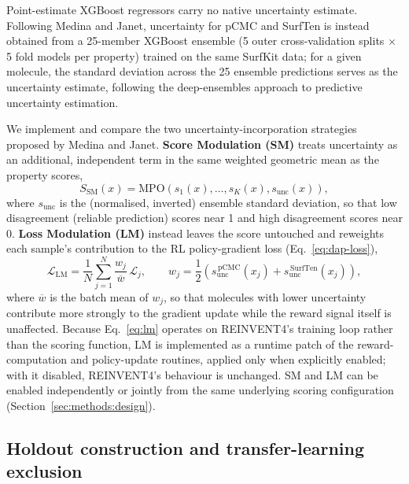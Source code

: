 \documentclass[11pt]{aime}
\begin{document}
Point-estimate XGBoost regressors carry no native uncertainty estimate.
Following Medina and Janet\cite{medina_uncertainty_2026}, uncertainty for pCMC and SurfTen is instead obtained from a 25-member XGBoost ensemble (5 outer cross-validation splits $\times$ 5 fold models per property) trained on the same SurfKit data;
for a given molecule, the standard deviation across the 25 ensemble predictions serves as the uncertainty estimate, following the deep-ensembles approach to predictive uncertainty estimation\cite{lakshminarayanan_simple_2017}.

We implement and compare the two uncertainty-incorporation strategies proposed by Medina and Janet\cite{medina_uncertainty_2026}.
\textbf{Score Modulation (SM)} treats uncertainty as an additional, independent term in the same weighted geometric mean as the property scores,
\begin{equation}
    S_\mathrm{SM}(x) = \mathrm{MPO}\!\left(s_1(x), \ldots, s_K(x), s_\mathrm{unc}(x)\right),
    \label{eq:sm}
\end{equation}
where $s_\mathrm{unc}$ is the (normalised, inverted) ensemble standard deviation, so that low disagreement (reliable prediction) scores near 1 and high disagreement scores near 0.
\textbf{Loss Modulation (LM)} instead leaves the score untouched and reweights each sample's contribution to the RL policy-gradient loss (Eq.~\ref{eq:dap-loss}),
\begin{equation}
    \mathcal{L}_\mathrm{LM} = \frac{1}{N}\sum_{j=1}^{N} \frac{w_j}{\overline{w}}\,\mathcal{L}_j,
    \qquad w_j = \frac{1}{2}\left(s_\mathrm{unc}^{\,\mathrm{pCMC}}(x_j) + s_\mathrm{unc}^{\,\mathrm{SurfTen}}(x_j)\right),
    \label{eq:lm}
\end{equation}
where $\overline{w}$ is the batch mean of $w_j$, so that molecules with lower uncertainty contribute more strongly to the gradient update while the reward signal itself is unaffected.
Because Eq.~\ref{eq:lm} operates on REINVENT4's training loop rather than the scoring function, LM is implemented as a runtime patch of the reward-computation and policy-update routines, applied only when explicitly enabled; with it disabled, REINVENT4's behaviour is unchanged.
SM and LM can be enabled independently or jointly from the same underlying scoring configuration (Section~\ref{sec:methods:design}).

\subsection{Holdout construction and transfer-learning exclusion}
\label{sec:methods:holdout}
\end{document}
